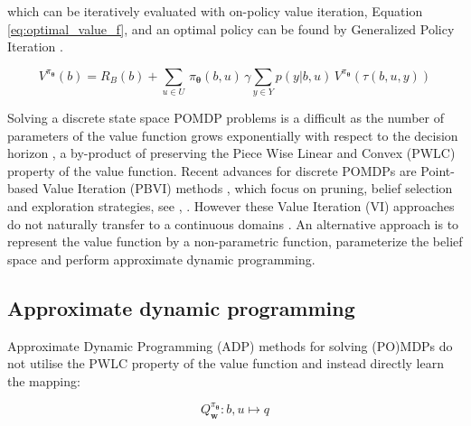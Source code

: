 \documentclass[final,5p,times,twocolumn]{elsarticle}
\newcommand{\Param}{\boldsymbol{\theta}}
\begin{document}
which can be iteratively evaluated with on-policy value iteration, Equation \ref{eq:optimal_value_f}, and an optimal policy can be found 
by Generalized Policy Iteration \cite[Chap. 4.6]{sutton1998reinforcement}.

\begin{equation} \label{eq:optimal_value_f}
  V^{\pi_{\Param}}(b) = R_B(b) + \sum\limits_{u \in U}\, \pi_{\Param}(b,u)\, \gamma \sum\limits_{y\in Y} p(y|b,u)\, V^{\pi_{\Param}}(\tau(b,u,y))
\end{equation}

Solving a discrete state space POMDP problems is a difficult as the number of parameters of the value function grows 
exponentially with respect to the decision horizon \cite[Chap. 15]{Thrun_Burgard_Fox_2005}\cite{Sondik_1973},
a by-product of preserving the Piece Wise Linear and Convex (PWLC) property of the value function. Recent 
advances for discrete POMDPs are  Point-based Value Iteration (PBVI) methods \cite{PBVI_2003}, which focus
on pruning, belief selection and exploration strategies, see \cite{Veiga14aaai}, \cite{POMDP_approach_2010}.
However these Value Iteration (VI) approaches do not naturally transfer to a 
continuous domains \cite{cPBVI_2006}. An alternative approach is to represent the value function by a non-parametric function,
parameterize the belief space and perform approximate dynamic programming.


\subsection{Approximate dynamic programming}

%

%


Approximate Dynamic Programming (ADP)\cite{approx_rl_overview_2011} methods for solving (PO)MDPs do not utilise the PWLC 
property of the value function and instead directly learn the mapping:

\begin{equation}
  Q_\mathbf{w}^{\pi_{\Param}}: b,u \mapsto q
\end{equation}
\end{document}
